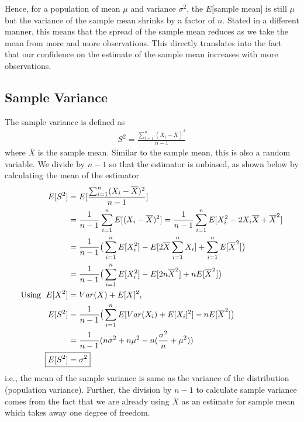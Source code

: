 \documentclass[../probability-notes.tex]{subfiles}
\begin{document}
    Hence, for a population of mean $\mu$ and variance $\sigma^{2}$, the $E[$sample mean$]$ is still $\mu$ but the variance of the sample mean shrinks by a factor of $n$. Stated in a different manner, this means that the spread of the sample mean reduces as we take the mean from more and more observations. This directly translates into the fact that our confidence on the estimate of the sample mean increases with more observations.\newline

    \subsection{Sample Variance}
    The sample variance is defined as
    \begin{align*}
        S^{2} = \frac{\sum_{i=1}^{n} (X_{i} - \overline{X})^{2}}{n - 1}
    \end{align*}
    where $\overline{X}$ is the sample mean. Similar to the sample mean, this is also a random variable. We divide by $n-1$ so that the estimator is unbiased, as shown below by calculating the mean of the estimator
    \begin{align*}
        E[S^{2}] &= E[\frac{\sum_{i=1}^{n} (X_{i} - \overline{X})^{2}}{n - 1}]\\
        &= \frac{1}{n-1} \sum_{i=1}^{n} E[(X_{i} - \overline{X})^{2}]
        = \frac{1}{n-1} \sum_{i=1}^{n} E[X_{i}^{2} - 2X_{i} \overline{X} + \overline{X}^{2}]\\
        &= \frac{1}{n-1} \big( \sum_{i=1}^{n} E[X_{i}^{2}] - E[2\overline{X} \sum_{i=1}^{n}X_{i}] + \sum_{i=1}^{n}E[\overline{X}^{2}] \big)\\
        &= \frac{1}{n-1} \big( \sum_{i=1}^{n} E[X_{i}^{2}] - E[2n\overline{X}^{2}] + nE[\overline{X}^{2}] \big)\\
        \text{Using \;} E[X^{2}] &= Var(X) + E[X]^{2},\\
        E[S^{2}] &= \frac{1}{n-1} \big( \sum_{i=1}^{n} E[Var(X_{i}) + E[X_{i}]^{2}] - nE[\overline{X}^{2}] \big)\\
        &= \frac{1}{n-1}(n\sigma^{2} + n\mu^{2} - n(\frac{\sigma^{2}}{n} + \mu^{2}))\\
        \Aboxed{E[S^{2}] &= \sigma^{2}}
    \end{align*}
    i.e., the mean of the sample variance is same as the variance of the distribution (population variance). Further, the division by $n-1$ to calculate sample variance comes from the fact that we are already using $\overline{X}$ as an estimate for sample mean which takes away one degree of freedom.
\end{document}
